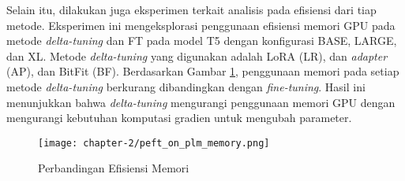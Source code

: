 Selain itu, dilakukan juga eksperimen terkait analisis pada efisiensi dari tiap metode. Eksperimen ini mengeksplorasi penggunaan efisiensi memori GPU pada metode \textit{delta-tuning} dan FT pada model T5 dengan konfigurasi BASE, LARGE, dan XL. Metode \textit{delta-tuning} yang digunakan adalah LoRA (LR), dan \textit{adapter} (AP), dan BitFit (BF). Berdasarkan Gambar \ref{fig:peft_on_plm_memory}, penggunaan memori pada setiap metode \textit{delta-tuning} berkurang dibandingkan dengan \textit{fine-tuning}. Hasil ini menunjukkan bahwa \textit{delta-tuning} mengurangi penggunaan memori GPU dengan mengurangi kebutuhan komputasi gradien untuk mengubah parameter.

\begin{figure}[ht]
    \centering
    \texttt{[image: chapter-2/peft\_on\_plm\_memory.png]}
    \caption{Perbandingan Efisiensi Memori \parencite{peft_on_plm}}
    \label{fig:peft_on_plm_memory}
\end{figure}
